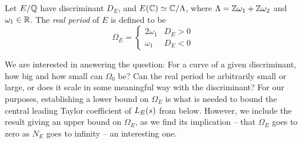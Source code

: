 \begin{definition}\label{defn:real_period}
Let $E/\mathbb{Q}$ have discriminant $D_E$, and $E(\mathbb{C}) \simeq \mathbb{C}/\Lambda$, where $\Lambda = \mathbb{Z}\omega_1 + \mathbb{Z}\omega_2$ and $\omega_1 \in \mathbb{R}$. The {\it real period} of $E$ is defined to be
\begin{equation}
\Omega_E = \begin{cases} 2\omega_1 & D_E > 0 \\ \omega_1 & D_E < 0 \end{cases}
\end{equation}
\end{definition}

We are interested in answering the question: For a curve of a given discriminant, how big and how small can $\Omega_0$ be? Can the real period be arbitrarily small or large, or does it scale in some meaningful way with the discriminant? For our purposes, establishing a lower bound on $\Omega_E$ is what is needed to bound the central leading Taylor coefficient of $L_E(s)$ from below. However, we include the result giving an upper bound on $\Omega_E$, as we find its implication -- that $\Omega_E$ goes to zero as $N_E$ goes to infinity -- an interesting one. \\

